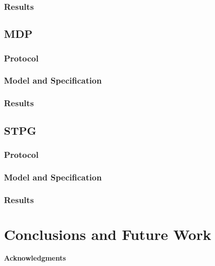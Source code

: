 \documentclass{llncs}
\begin{document}
\subsubsection{Results}

\subsection{MDP}
\subsubsection{Protocol}
\subsubsection{Model and Specification}
\subsubsection{Results}

\subsection{STPG}
\subsubsection{Protocol}
\subsubsection{Model and Specification}
\subsubsection{Results}

\section{Conclusions and Future Work}

\paragraph{Acknowledgments}
\end{document}
